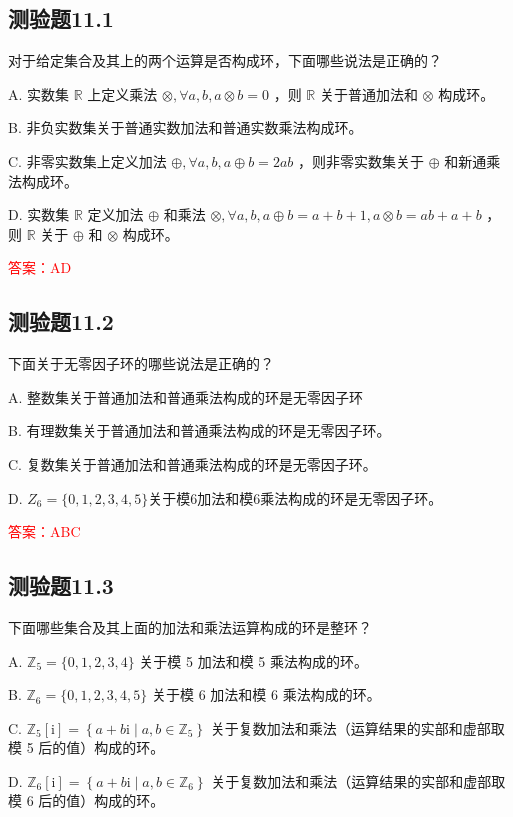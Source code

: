 \documentclass[UTF8, heading=true]{ctexart}
\begin{document}
\subsection{测验题11.1}

对于给定集合及其上的两个运算是否构成环，下面哪些说法是正确的？

A. 实数集 $\mathbb{R}$ 上定义乘法 $\otimes, \forall a, b, a \otimes b=0$ ，则 $\mathbb{R}$ 关于普通加法和 $\otimes$ 构成环。

B. 非负实数集关于普通实数加法和普通实数乘法构成环。

C. 非零实数集上定义加法 $\oplus, \forall a, b, a \oplus b=2 a b$ ，则非零实数集关于 $\oplus$ 和新通乘法构成环。

D. 实数集 $\mathbb{R}$ 定义加法 $\oplus$ 和乘法 $\otimes, \forall a, b, a \oplus b=a+b+1, a \otimes b=a b+a+b$ ，则 $\mathbb{R}$ 关于 $\oplus$ 和 $\otimes$ 构成环。

\textcolor{red}{答案：AD}

\subsection{测验题11.2}

下面关于无零因子环的哪些说法是正确的？

A. 整数集关于普通加法和普通乘法构成的环是无零因子环

B. 有理数集关于普通加法和普通乘法构成的环是无零因子环。

C. 复数集关于普通加法和普通乘法构成的环是无零因子环。

D. $Z_6=\{0, 1,2,3,4,5\}$关于模6加法和模6乘法构成的环是无零因子环。

\textcolor{red}{答案：ABC}

\subsection{测验题11.3}

下面哪些集合及其上面的加法和乘法运算构成的环是整环？

A. $\mathbb{Z}_5=\{0,1,2,3,4\}$ 关于模 5 加法和模 5 乘法构成的环。

B. $\mathbb{Z}_6=\{0,1,2,3,4,5\}$ 关于模 6 加法和模 6 乘法构成的环。

C. $\mathbb{Z}_5[\mathrm{i}]=\left\{a+b \mathrm{i} \mid a, b \in \mathbb{Z}_5\right\}$ 关于复数加法和乘法（运算结果的实部和虚部取模 5 后的值）构成的环。

D. $\mathbb{Z}_6[\mathrm{i}]=\left\{a+b \mathrm{i} \mid a, b \in \mathbb{Z}_6\right\}$ 关于复数加法和乘法（运算结果的实部和虚部取模 6 后的值）构成的环。
\end{document}
